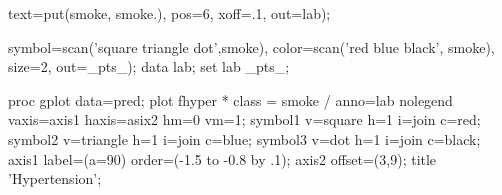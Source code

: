 \begin{listing}
   text=put(smoke, smoke.), pos=6, xoff=.1, out=lab);

   symbol=scan('square triangle dot',smoke),
   color=scan('red blue black', smoke), size=2, out=_pts_);
data lab;
   set lab _pts_;

proc gplot data=pred;
   plot fhyper  * class = smoke / anno=lab nolegend
      vaxis=axis1 haxis=asix2 hm=0 vm=1;
   symbol1 v=square   h=1 i=join c=red;
   symbol2 v=triangle h=1 i=join c=blue;
   symbol3 v=dot      h=1 i=join c=black;
   axis1 label=(a=90) order=(-1.5 to -0.8 by .1);
   axis2 offset=(3,9);
   title 'Hypertension';
\end{listing}
